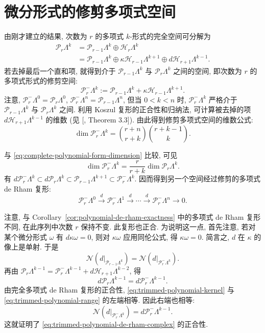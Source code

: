 \section{微分形式的修剪多项式空间}\label{sec:trimmed-polynomial-forms}

由刚才建立的结果, 次数为 $r$ 的多项式 $k$-形式的完全空间可分解为
\[
\begin{aligned}
\mathcal P_r\Lambda^k&=\mathcal P_{r-1}\Lambda^k\oplus\mathcal H_r\Lambda^k\\
&=\mathcal P_{r-1}\Lambda^k\oplus\kappa\mathcal H_{r-1}\Lambda^{k+1}\oplus d\mathcal H_{r+1}\Lambda^{k-1}.
\end{aligned}
\]
若去掉最后一个直和项, 就得到介于 $\mathcal P_{r-1}\Lambda^k$ 与 $\mathcal P_r\Lambda^k$ 之间的空间, 即次数为 $r$ 的多项式形式的修剪空间:
\[
\mathcal P_r^-\Lambda^k:=\mathcal P_{r-1}\Lambda^k+\kappa\mathcal H_{r-1}\Lambda^{k+1}.
\]
注意, $\mathcal P_r^-\Lambda^0=\mathcal P_r\Lambda^0$, $\mathcal P_r^-\Lambda^n=\mathcal P_{r-1}\Lambda^n$, 但当 $0<k<n$ 时, $\mathcal P_r^-\Lambda^k$ 严格介于 $\mathcal P_{r-1}\Lambda^k$ 与 $\mathcal P_r\Lambda^k$ 之间. 利用 Koszul 复形的正合性和归纳法, 可计算被去掉的项 $d\mathcal H_{r+1}\Lambda^{k-1}$ 的维数 (见 [, Theorem 3.3]). 由此得到修剪多项式空间的维数公式:
\[
\dim\mathcal P_r^-\Lambda^k=\binom{r+n}{r+k}\binom{r+k-1}k.
\]

与 \eqref{eq:complete-polynomial-form-dimension} 比较, 可见
\[
\dim\mathcal P_r^-\Lambda^k=\frac r{r+k}\dim\mathcal P_r\Lambda^k.
\]
有 $d\mathcal P_r^-\Lambda^k\subset d\mathcal P_r\Lambda^k\subset\mathcal P_{r-1}\Lambda^{k+1}\subset\mathcal P_r^-\Lambda^k$. 因而得到另一个空间经过修剪的多项式 de Rham 复形:
\begin{equation}\label{eq:trimmed-polynomial-de-rham-complex}
\mathcal P_r^-\Lambda^0\xrightarrow{d}\mathcal P_r^-\Lambda^1\xrightarrow{d}\cdots\xrightarrow{d}\mathcal P_r^-\Lambda^n\to0.
\end{equation}

注意, 与 Corollary~\ref{cor:polynomial-de-rham-exactness} 中的多项式 de Rham 复形不同, 在此序列中次数 $r$ 保持不变. 此复形也正合. 为说明这一点, 首先注意, 若对某个微分形式 $\omega$ 有 $d\kappa\omega=0$, 则对 $\kappa\omega$ 应用同伦公式, 得 $\kappa\omega=0$. 简言之, $d$ 在 $\kappa$ 的像上是单射. 于是
\begin{equation}\label{eq:trimmed-polynomial-kernel}
\mathcal N(d|_{\mathcal P_{r-1}\Lambda^k})=\mathcal N(d|_{\mathcal P_r^-\Lambda^k}).
\end{equation}
再由 $\mathcal P_r\Lambda^{k-1}=\mathcal P_r^-\Lambda^{k-1}+d\mathcal H_{r+1}\Lambda^{k-2}$, 得
\begin{equation}\label{eq:trimmed-polynomial-range}
d\mathcal P_r\Lambda^{k-1}=d\mathcal P_r^-\Lambda^{k-1}.
\end{equation}
由完全多项式 de Rham 复形的正合性, \eqref{eq:trimmed-polynomial-kernel} 与 \eqref{eq:trimmed-polynomial-range} 的左端相等. 因此右端也相等:
\[
\mathcal N(d|_{\mathcal P_r^-\Lambda^k})=d\mathcal P_r^-\Lambda^{k-1}.
\]
这就证明了 \eqref{eq:trimmed-polynomial-de-rham-complex} 的正合性.

